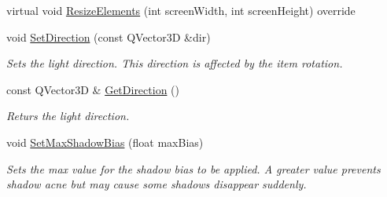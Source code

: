 \begin{DoxyCompactItemize}
\item 
virtual void \mbox{\hyperlink{class_geometry_engine_1_1_geometry_world_item_1_1_geometry_light_1_1_shadow_map_light_a3166b61bf08297eddf8b9e867c6d044a}{Resize\+Elements}} (int screen\+Width, int screen\+Height) override
\item 
\mbox{\label{class_geometry_engine_1_1_geometry_world_item_1_1_geometry_light_1_1_shadow_map_light_ab83e05de53238453ebc8ed4b3a8777bc}} 
void \mbox{\hyperlink{class_geometry_engine_1_1_geometry_world_item_1_1_geometry_light_1_1_shadow_map_light_ab83e05de53238453ebc8ed4b3a8777bc}{Set\+Direction}} (const Q\+Vector3D \&dir)
\begin{DoxyCompactList}\small\item\em Sets the light direction. This direction is affected by the item rotation. \end{DoxyCompactList}\item 
\mbox{\label{class_geometry_engine_1_1_geometry_world_item_1_1_geometry_light_1_1_shadow_map_light_a5443fd7c5c2549073841c691f21ba1e4}} 
const Q\+Vector3D \& \mbox{\hyperlink{class_geometry_engine_1_1_geometry_world_item_1_1_geometry_light_1_1_shadow_map_light_a5443fd7c5c2549073841c691f21ba1e4}{Get\+Direction}} ()
\begin{DoxyCompactList}\small\item\em Returs the light direction. \end{DoxyCompactList}\item 
\mbox{\label{class_geometry_engine_1_1_geometry_world_item_1_1_geometry_light_1_1_shadow_map_light_af079c90bd349e7b4c45713271b8ffe2a}} 
void \mbox{\hyperlink{class_geometry_engine_1_1_geometry_world_item_1_1_geometry_light_1_1_shadow_map_light_af079c90bd349e7b4c45713271b8ffe2a}{Set\+Max\+Shadow\+Bias}} (float max\+Bias)
\begin{DoxyCompactList}\small\item\em Sets the max value for the shadow bias to be applied. A greater value prevents shadow acne but may cause some shadows disappear suddenly. \end{DoxyCompactList}\item 
\mbox{\label{class_geometry_engine_1_1_geometry_world_item_1_1_geometry_light_1_1_shadow_map_light_a6e0a525a1d150179e26af0d068e9379e}} 

\end{DoxyCompactItemize}
